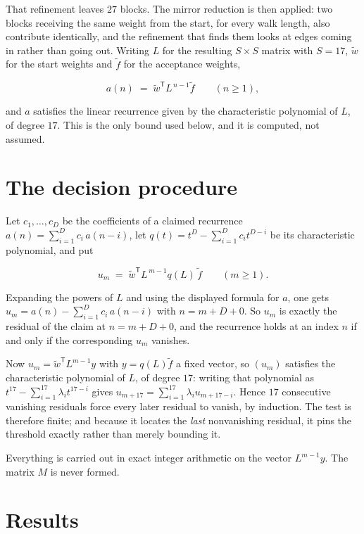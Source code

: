 \documentclass[11pt]{article}
\theoremstyle{definition}
\begin{document}
That refinement leaves $27$ blocks. The mirror reduction is then applied: two blocks receiving the same weight from the start, for every walk length, also contribute identically, and the refinement that finds them looks at edges coming in rather than going out. Writing $L$ for the resulting $S \times S$ matrix with $S = 17$, $\tilde w$ for the start weights and $\tilde f$ for the acceptance weights,

\[a(n) \;=\; \tilde w^{\mathsf T} L^{\,n-1} \tilde f \qquad (n \ge 1),\]

and $a$ satisfies the linear recurrence given by the characteristic polynomial of $L$, of degree $17$. This is the only bound used below, and it is computed, not assumed.

\section{The decision procedure}

Let $c_1,\dots,c_D$ be the coefficients of a claimed recurrence $a(n) = \sum_{i=1}^{D} c_i\,a(n-i)$, let $q(t) = t^{D} - \sum_{i=1}^{D} c_i t^{D-i}$ be its characteristic polynomial, and put

\[u_m \;=\; \tilde w^{\mathsf T} L^{\,m-1} q(L)\,\tilde f \qquad (m \ge 1).\]

Expanding the powers of $L$ and using the displayed formula for $a$, one gets $u_m = a(n) - \sum_{i=1}^{D} c_i\,a(n-i)$ with $n = m + D + 0$. So $u_m$ is exactly the residual of the claim at $n = m + D + 0$, and the recurrence holds at an index $n$ if and only if the corresponding $u_m$ vanishes.

Now $u_m = \tilde w^{\mathsf T} L^{m-1} y$ with $y = q(L)\tilde f$ a fixed vector, so $(u_m)$ satisfies the characteristic polynomial of $L$, of degree $17$: writing that polynomial as $t^{17} - \sum_{i=1}^{17} \lambda_i t^{17-i}$ gives $u_{m+17} = \sum_{i=1}^{17} \lambda_i u_{m+17-i}$. Hence $17$ consecutive vanishing residuals force every later residual to vanish, by induction. The test is therefore finite; and because it locates the {\itshape last} nonvanishing residual, it pins the threshold exactly rather than merely bounding it.

Everything is carried out in exact integer arithmetic on the vector $L^{m-1}y$. The matrix $M$ is never formed.

\section{Results}
\end{document}
